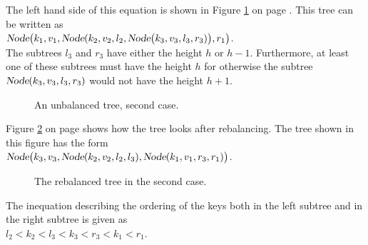 \begin{enumerate}
       The left hand side of this equation is shown in Figure  \ref{fig:caselr} on page
       \pageref{fig:caselr}.  This tree can be written as
       \\[0.2cm]
       \hspace*{1.3cm} 
       $\textsl{Node}\bigl(k_1,v_1,\textsl{Node}(k_2,v_2,l_2,\textsl{Node}\bigl(k_3,v_3,l_3,r_3)\bigr),r_1\bigr)$. 
       \\[0.2cm]
       The subtrees $l_3$ and $r_3$ have either the height  $h$ or $h-1$.  Furthermore, at least one
       of these subtrees must have the height  $h$ for otherwise the subtree
       $\textsl{Node}(k_3,v_3,l_3,r_3)$ would not have the height $h+1$.
       
\begin{figure}[!ht]
  \centering
  \caption{An unbalanced tree, second case.}
  \label{fig:caselr}
\end{figure}

     Figure \ref{fig:caselr-nach} on page \pageref{fig:caselr-nach} shows how the tree looks after
     rebalancing.  The tree shown in this figure has the form
     \\[0.2cm]
     \hspace*{1.3cm} 
     $\textsl{Node}\bigl(k_3,v_3,\textsl{Node}(k_2,v_2,l_2,l_3),\textsl{Node}(k_1,v_1,r_3,r_1) \bigr)$.


\begin{figure}[!ht]
  \centering
  \caption{The rebalanced tree in the second case.}
  \label{fig:caselr-nach}
\end{figure}

      The inequation describing the ordering of the keys both in the left subtree and in the right
      subtree is given as
      \\[0.2cm]
      \hspace*{1.3cm} $l_2 < k_2 < l_3 < k_3 < r_3 < k_1 < r_1$.


\end{enumerate}

